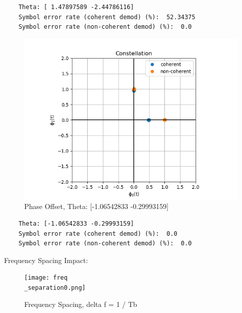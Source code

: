 \documentclass[
	letterpaper, %
	10pt, %
]{CSUniSchoolLabReport}
\begin{document}
\begin{lstlisting}
	Theta: [ 1.47897589 -2.44786116]
	Symbol error rate (coherent demod) (%):  52.34375
	Symbol error rate (non-coherent demod) (%):  0.0
\end{lstlisting}

\begin{figure}[H] %
	\centering %
	\includegraphics[width=1.2\textwidth]{phase_offset4.png} %
	\caption{Phase Offset, Theta: [-1.06542833 -0.29993159]}
	\label{fig:block}
\end{figure}

\begin{lstlisting}
	Theta: [-1.06542833 -0.29993159]
	Symbol error rate (coherent demod) (%):  0.0
	Symbol error rate (non-coherent demod) (%):  0.0
\end{lstlisting}

Frequency Spacing Impact:

\begin{figure}[H] %
	\centering %
	\texttt{[image: freq\\\_separation0.png]} %
	\caption{Frequency Spacing, delta f = 1 / Tb}
	\label{fig:block}
\end{figure}
\end{document}
